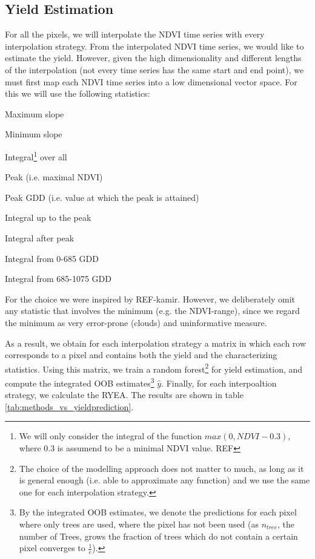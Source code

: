 {    \subsection{Yield Estimation}{
        \label{sec:corr_yield_est}
        For all the pixels, we will interpolate the NDVI time series with every interpolation strategy. From the interpolated NDVI time series, we would like to estimate the yield. However, given the high dimensionality and different lengths of the interpolation (not every time series has the same start and end point), we must first map each NDVI time series into a low dimensional vector space. For this we will use the following statistics:
        \begin{Nitemize}
            \item Maximum slope
            \item Minimum slope
            \item Integral\footnote{\label{note:integral-min} We will only consider the integral of the function $max(0, NDVI - 0.3)$, where $0.3$ is assumend to be a minimal NDVI value. REF} over all
            \item Peak (i.e. maximal NDVI)
            \item Peak GDD (i.e. value at which the peak is attained)
            \item Integral up to the peak
            \item Integral after peak
            \item Integral from 0-685 GDD
            \item Integral from 685-1075 GDD    
        \end{Nitemize}
        For the choice we were inspired by REF-kamir. However, we deliberately omit any statistic that involves the minimum (e.g. the NDVI-range), since we regard the minimum as very error-prone (clouds) and uninformative measure. 
        
        As a result, we obtain for each interpolation strategy a matrix in which each row corresponds to a pixel and contains both the yield and the characterizing statistics.
        Using this matrix, we train a random forest\footnote{The choice of the modelling approach does not matter to much, as long as it is general enough (i.e. able to approximate any function) and we use the same one for each interpolation strategy.} for yield estimation, and compute the integrated OOB estimates\footnote{By the integrated OOB estimates, we denote the predictions for each pixel where only trees are used, where the pixel has not been used (as $n_{tree}$, the number of Trees, grows the fraction of trees which do not contain a certain pixel converges to $\frac{1}{e}$).} $\hat y$. Finally, for each interpoaltion strategy, we calculate the RYEA. The results are shown in table \ref{tab:methods_vs_yieldprediction}.
    }

    
    
    
}




